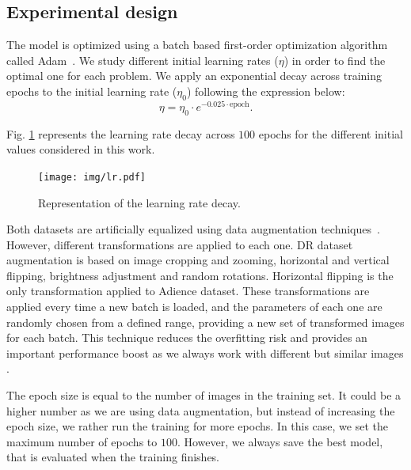 \documentclass[journal]{IEEEtran}
\begin{document}
	\subsection{Experimental design}
	\label{sect:settings}
	The model is optimized using a batch based first-order optimization algorithm called Adam~\cite{kingma2014adam}. We study different initial learning rates ($\eta$) in order to find the optimal one for each problem. We apply an exponential decay across training epochs to the initial learning rate ($\eta_0$) following the expression below:
	\begin{equation}
		\eta = \eta_0 \cdot e^{-0.025 \cdot \text{epoch}}.
	\end{equation}
	
	Fig. \ref{fig:lrdecay} represents the learning rate decay across $100$ epochs for the different initial values considered in this work.
	\begin{figure}[!t]
		\centering
		\texttt{[image: img/lr.pdf]}
		\caption{Representation of the learning rate decay.}
		\label{fig:lrdecay}
	\end{figure}
	
	Both datasets are artificially equalized using data augmentation techniques~\cite{van2001art}. However, different transformations are applied to each one. DR dataset augmentation is based on image cropping and zooming, horizontal and vertical flipping, brightness adjustment and random rotations. Horizontal flipping is the only transformation applied to Adience dataset. These transformations are applied every time a new batch is loaded, and the parameters of each one are randomly chosen from a defined range, providing a new set of transformed images for each batch. This technique reduces the overfitting risk and provides an important performance boost as we always work with different but similar images \cite{krizhevsky2012imagenet}.
	
	The epoch size is equal to the number of images in the training set. It could be a higher number as we are using data augmentation, but instead of increasing the epoch size, we rather run the training for more epochs. In this case, we set the maximum number of epochs to $100$. However, we always save the best model, that is evaluated when the training finishes.
	
\end{document}
